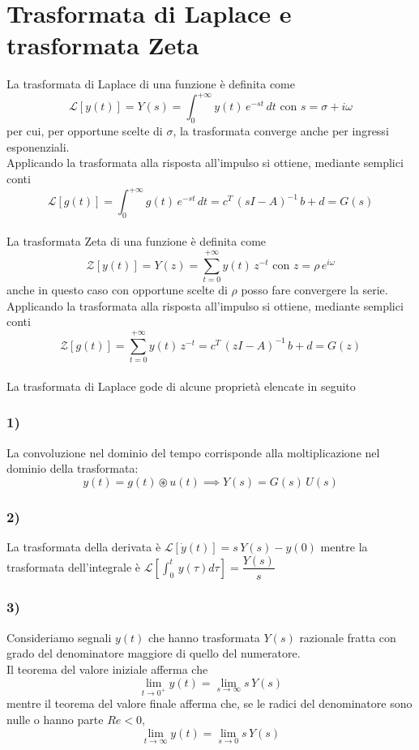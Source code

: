 \documentclass[a4paper]{article}
\begin{document}
	\section{Trasformata di Laplace e trasformata Zeta}\label{trasf lapl}
	La trasformata di Laplace di una funzione è definita come \[\mathcal{L}[y(t)]=Y(s)=\int_{0}^{+\infty}y(t)\,e^{-st}\,dt\,\, \text{con} \,\, s=\sigma+i\omega\]
	per cui, per opportune scelte di $\sigma$, la trasformata converge anche per ingressi esponenziali.
	\\Applicando la trasformata alla risposta all'impulso si ottiene, mediante semplici conti
	\[\mathcal{L}[g(t)]=\int_{0}^{+\infty}g(t)\,e^{-st}\,dt=c^T\,(sI-A)^{-1}\,b+d=G(s)\]
	\newline \\
	La trasformata Zeta di una funzione è definita come
	\[\mathcal{Z}[y(t)]=Y(z)=\sum_{t=0}^{+\infty}y(t)\,z^{-t} \,\,\text{con} \,\, z=\rho\,e^{i\omega}\]
	anche in questo caso con opportune scelte di $\rho$ posso fare convergere la serie.
	\\Applicando la trasformata alla risposta all'impulso si ottiene, mediante semplici conti
	\[\mathcal{Z}[g(t)]=\sum_{t=0}^{+\infty}y(t)\,z^{-t}=c^T\,(zI-A)^{-1}\,b+d=G(z)\]
	\newline \\
	\bigskip
	La trasformata di Laplace gode di alcune proprietà elencate in seguito
	\subsubsection*{1)}
	La convoluzione nel dominio del tempo corrisponde alla moltiplicazione nel dominio della trasformata:
	\[y(t)=g(t)\circledast u(t)\implies Y(s)=G(s)\,U(s) \]
	\subsubsection*{2)}
	La trasformata della derivata è $\mathcal{L}[\dot{y}(t)]=s\,Y(s)-y(0)$ mentre la trasformata dell'integrale è $\mathcal{L}[\int_{0}^t\,y(\tau) d\tau]=\dfrac{Y(s)}{s}$
	\subsubsection*{3)}
	Consideriamo segnali $y(t)$ che hanno trasformata $Y(s)$ razionale fratta con grado del denominatore maggiore di quello del numeratore.\\
	Il teorema del valore iniziale afferma che 
	\[\lim_{t\to 0^+}y(t)=\lim_{s\to\infty}s\,Y(s)\]
	mentre il teorema del valore finale afferma che, se le radici del denominatore sono nulle o hanno parte $Re<0$,
	\[\lim_{t\to \infty}y(t)=\lim_{s\to 0}s\,Y(s)\]
\end{document}
